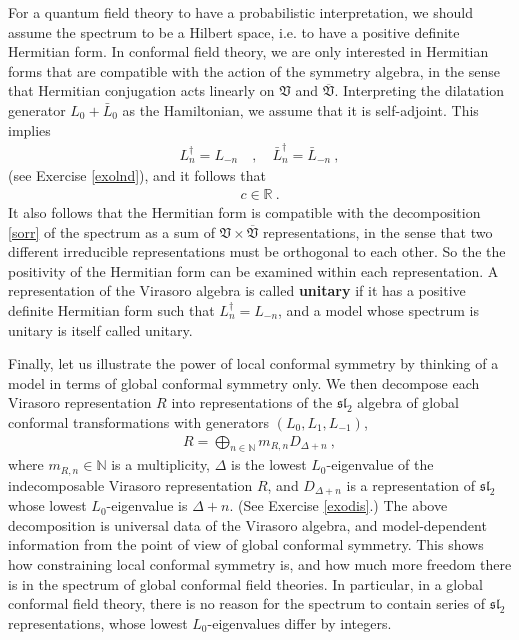 \documentclass[12pt, a4paper, notitlepage, twoside]{report}
\numberwithin{equation}{section}
\theoremstyle{break}
\begin{document}
For a quantum field theory to have a probabilistic interpretation, 
we should assume the spectrum to be a Hilbert space, i.e. to have a positive definite Hermitian form. 
In conformal field theory, we are only interested in Hermitian forms that are compatible with the action of the symmetry algebra, in the sense that Hermitian conjugation acts linearly on $\mathfrak{V}$ and $\overline{\mathfrak{V}}$. 
Interpreting the dilatation generator $L_0+\bar L_0$ as the Hamiltonian, we assume that it is self-adjoint.
This implies 
\begin{align}
 L^\dagger_n = L_{-n} \quad , \quad \bar L_n^\dagger = \bar L_{-n}\ ,
\label{ldn}
\end{align}
(see Exercise \ref{exolnd}), and it follows that
\begin{align}
 c\in {\mathbb{R}}\ .
\label{cir}
\end{align}
It also follows that the Hermitian form is compatible with the decomposition \eqref{sorr} of the spectrum as a sum of $\mathfrak{V}\times \overline{\mathfrak{V}}$ representations, in the sense that two different irreducible representations must be orthogonal to each other.
So the the positivity of the Hermitian form can be examined within each representation.
A representation of the Virasoro algebra is called \textbf{\boldmath unitary} if it has a positive definite Hermitian form such that 
$L^\dagger_n = L_{-n}$, and a model whose spectrum is unitary is itself called unitary. 

Finally, let us illustrate the power of local conformal symmetry by thinking of a model in terms of global conformal symmetry only. 
We then decompose each Virasoro representation $R$ into representations of the $\mathfrak{sl}_2$ algebra of global conformal transformations with generators $(L_0,L_1,L_{-1})$,
\begin{align}
 R=\bigoplus_{n\in{\mathbb{N}}} m_{R,n} D_{\Delta+n}\ ,
\label{rbd}
\end{align}
where $m_{R,n}\in {\mathbb{N}}$ is a multiplicity, $\Delta$ is the lowest $L_0$-eigenvalue of the indecomposable Virasoro representation $R$, and $D_{\Delta+n}$ is a representation of $\mathfrak{sl}_2$ whose lowest $L_0$-eigenvalue is $\Delta+n$.
(See Exercise \ref{exodis}.)
The above decomposition is universal data of the Virasoro algebra, and 
model-dependent information from the point of view of global conformal symmetry.
This shows how constraining local conformal symmetry is, and how much more freedom there is in the spectrum of global conformal field theories.
In particular, in a global conformal field theory, there is no reason for the spectrum to contain series of
$\mathfrak{sl}_2$ representations, whose lowest $L_0$-eigenvalues differ by integers. 
\end{document}
